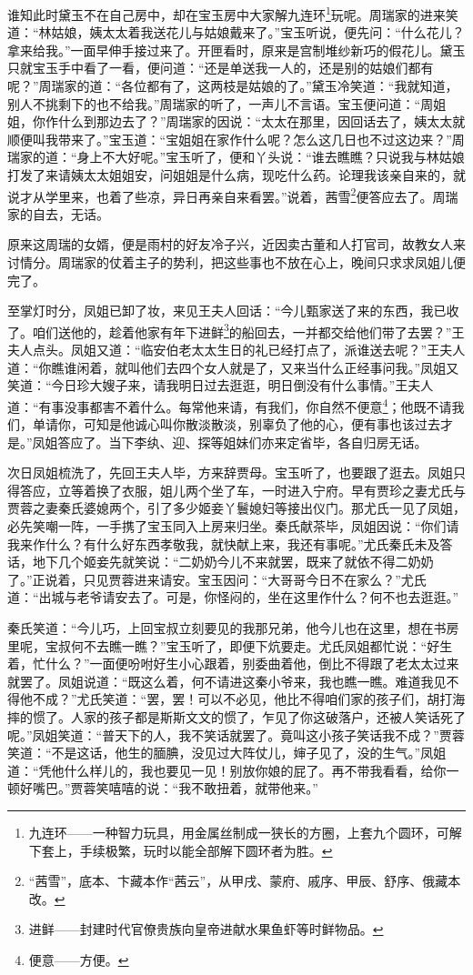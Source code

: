 \par 谁知此时黛玉不在自己房中，却在宝玉房中大家解九连环\footnote{九连环——一种智力玩具，用金属丝制成一狭长的方圈，上套九个圆环，可解下套上，手续极繁，玩时以能全部解下圆环者为胜。}玩呢。周瑞家的进来笑道：“林姑娘，姨太太着我送花儿与姑娘戴来了。”宝玉听说，便先问：“什么花儿？拿来给我。”一面早伸手接过来了。开匣看时，原来是宫制堆纱新巧的假花儿。黛玉只就宝玉手中看了一看，便问道：“还是单送我一人的，还是别的姑娘们都有呢？”周瑞家的道：“各位都有了，这两枝是姑娘的了。”黛玉冷笑道：“我就知道，别人不挑剩下的也不给我。”周瑞家的听了，一声儿不言语。宝玉便问道：“周姐姐，你作什么到那边去了？”周瑞家的因说：“太太在那里，因回话去了，姨太太就顺便叫我带来了。”宝玉道：“宝姐姐在家作什么呢？怎么这几日也不过这边来？”周瑞家的道：“身上不大好呢。”宝玉听了，便和丫头说：“谁去瞧瞧？只说我与林姑娘打发了来请姨太太姐姐安，问姐姐是什么病，现吃什么药。论理我该亲自来的，就说才从学里来，也着了些凉，异日再亲自来看罢。”说着，茜雪\footnote{“茜雪”，底本、卞藏本作“茜云”，从甲戌、蒙府、戚序、甲辰、舒序、俄藏本改。}便答应去了。周瑞家的自去，无话。
\par 原来这周瑞的女婿，便是雨村的好友冷子兴，近因卖古董和人打官司，故教女人来讨情分。周瑞家的仗着主子的势利，把这些事也不放在心上，晚间只求求凤姐儿便完了。
\par 至掌灯时分，凤姐已卸了妆，来见王夫人回话：“今儿甄家送了来的东西，我已收了。咱们送他的，趁着他家有年下进鲜\footnote{进鲜——封建时代官僚贵族向皇帝进献水果鱼虾等时鲜物品。}的船回去，一并都交给他们带了去罢？”王夫人点头。凤姐又道：“临安伯老太太生日的礼已经打点了，派谁送去呢？”王夫人道：“你瞧谁闲着，就叫他们去四个女人就是了，又来当什么正经事问我。”凤姐又笑道：“今日珍大嫂子来，请我明日过去逛逛，明日倒没有什么事情。”王夫人道：“有事没事都害不着什么。每常他来请，有我们，你自然不便意\footnote{便意——方便。}；他既不请我们，单请你，可知是他诚心叫你散淡散淡，别辜负了他的心，便有事也该过去才是。”凤姐答应了。当下李纨、迎、探等姐妹们亦来定省毕，各自归房无话。
\par 次日凤姐梳洗了，先回王夫人毕，方来辞贾母。宝玉听了，也要跟了逛去。凤姐只得答应，立等着换了衣服，姐儿两个坐了车，一时进入宁府。早有贾珍之妻尤氏与贾蓉之妻秦氏婆媳两个，引了多少姬妾丫鬟媳妇等接出仪门。那尤氏一见了凤姐，必先笑嘲一阵，一手携了宝玉同入上房来归坐。秦氏献茶毕，凤姐因说：“你们请我来作什么？有什么好东西孝敬我，就快献上来，我还有事呢。”尤氏秦氏未及答话，地下几个姬妾先就笑说：“二奶奶今儿不来就罢，既来了就依不得二奶奶了。”正说着，只见贾蓉进来请安。宝玉因问：“大哥哥今日不在家么？”尤氏道：“出城与老爷请安去了。可是，你怪闷的，坐在这里作什么？何不也去逛逛。”
\par 秦氏笑道：“今儿巧，上回宝叔立刻要见的我那兄弟，他今儿也在这里，想在书房里呢，宝叔何不去瞧一瞧？”宝玉听了，即便下炕要走。尤氏凤姐都忙说：“好生着，忙什么？”一面便吩咐好生小心跟着，别委曲着他，倒比不得跟了老太太过来就罢了。凤姐说道：“既这么着，何不请进这秦小爷来，我也瞧一瞧。难道我见不得他不成？”尤氏笑道：“罢，罢！可以不必见，他比不得咱们家的孩子们，胡打海摔的惯了。人家的孩子都是斯斯文文的惯了，乍见了你这破落户，还被人笑话死了呢。”凤姐笑道：“普天下的人，我不笑话就罢了。竟叫这小孩子笑话我不成？”贾蓉笑道：“不是这话，他生的腼腆，没见过大阵仗儿，婶子见了，没的生气。”凤姐道：“凭他什么样儿的，我也要见一见！别放你娘的屁了。再不带我看看，给你一顿好嘴巴。”贾蓉笑嘻嘻的说：“我不敢扭着，就带他来。”
